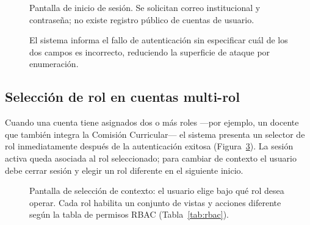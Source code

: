 \begin{figure}[H]
  \centering
  \caption[Pantalla de inicio de sesión de \textsc{macau}.]{Pantalla de inicio
    de sesión. Se solicitan correo institucional y contraseña; no existe
    registro público de cuentas de usuario.}
  \label{fig:cap_login}
\end{figure}

\begin{figure}[H]
  \centering
  \caption[Mensaje de error por credenciales incorrectas.]{El sistema informa
    el fallo de autenticación sin especificar cuál de los dos campos es
    incorrecto, reduciendo la superficie de ataque por enumeración.}
  \label{fig:cap_login_error}
\end{figure}

\subsection{Selección de rol en cuentas multi-rol}
\label{subsec:cap_multirrol}

Cuando una cuenta tiene asignados dos o más roles —por ejemplo, un docente
que también integra la Comisión Curricular— el sistema presenta un selector
de rol inmediatamente después de la autenticación exitosa
(Figura~\ref{fig:cap_multirrol}). La sesión activa queda asociada al rol
seleccionado; para cambiar de contexto el usuario debe cerrar sesión y
elegir un rol diferente en el siguiente inicio.

\begin{figure}[H]
  \centering
  \caption[Selector de rol para usuarios con múltiples roles.]{Pantalla de
    selección de contexto: el usuario elige bajo qué rol desea operar. Cada
    rol habilita un conjunto de vistas y acciones diferente según la tabla
    de permisos RBAC (Tabla~\ref{tab:rbac}).}
  \label{fig:cap_multirrol}
\end{figure}

